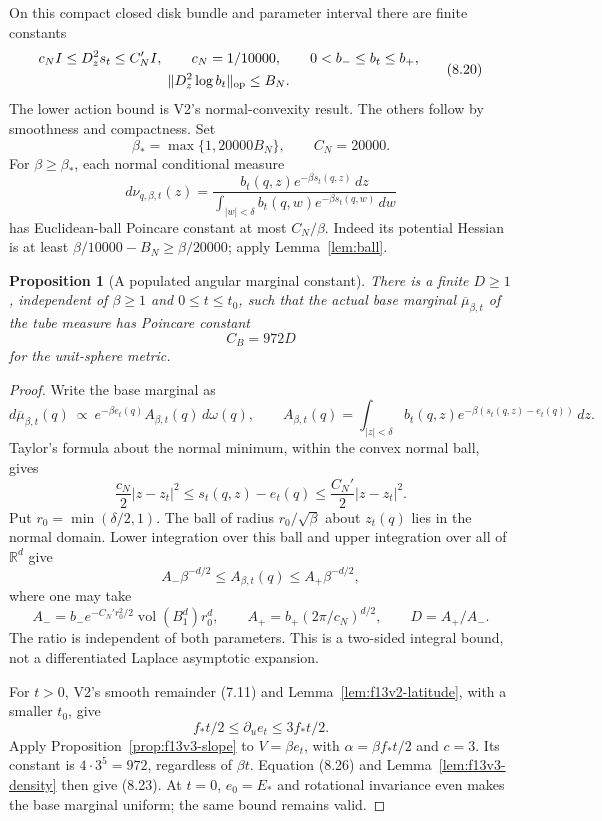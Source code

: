 \documentclass[11pt,oneside]{article}
\newtheorem{proposition}[theorem]{Proposition}
\begin{document}
On this compact closed disk
bundle and parameter interval
there are finite constants
\[
 \begin{gathered}
 c_N I\le D_z^2s_t\le C_N'I,
       \qquad c_N=1/10000,\qquad
       0<b_-\le b_t\le b_+,\\
 \|D_z^2\log b_t\|_{\rm op}\le B_N .
 \end{gathered}
 \tag{8.20}
\]
The lower action bound is
V2's normal-convexity result.
The others follow by
smoothness and compactness.
Set
\[
       \beta_*=\max\{1,20000 B_N\},\qquad C_N=20000.
 \tag{8.21}
\]
For \(\beta\ge\beta_*\), each
normal conditional measure
\[
 d\nu_{q,\beta,t}(z)
   =\frac{b_t(q,z)e^{-\beta s_t(q,z)}\,dz}
          {\int_{|w|<\delta}b_t(q,w)e^{-\beta s_t(q,w)}\,dw}
 \tag{8.22}
\]
has Euclidean-ball Poincare
constant at most \(C_N/\beta\).
Indeed its potential Hessian
is at least
\(\beta/10000-B_N\ge\beta/20000\);
apply Lemma~\ref{lem:ball}.

\begin{proposition}[A populated angular marginal constant]
\label{prop:f13v3-marginal}
There is a finite \(D\ge1\),
independent of \(\beta\ge1\)
and \(0\le t\le t_0\), such
that the actual base marginal
\(\overline\mu_{\beta,t}\) of
the tube measure has Poincare
constant
\[
                           C_B=972D
 \tag{8.23}
\]
for the unit-sphere metric.
\end{proposition}
\begin{proof}
Write the base marginal as
\[
 d\overline\mu_{\beta,t}(q)
  \ \propto\ e^{-\beta e_t(q)}
          A_{\beta,t}(q)\,d\omega(q),\qquad
 A_{\beta,t}(q)=
 \int_{|z|<\delta}b_t(q,z)
                  e^{-\beta(s_t(q,z)-e_t(q))}\,dz.
 \tag{8.24}
\]
Taylor's formula about the
normal minimum, within the
convex normal ball, gives
\[
 \frac{c_N}{2}|z-z_t|^2
       \le s_t(q,z)-e_t(q)
       \le\frac{C_N'}2|z-z_t|^2.
 \tag{8.25}
\]
Put \(r_0=\min(\delta/2,1)\).
The ball of radius
\(r_0/\sqrt\beta\) about
\(z_t(q)\) lies in the
normal domain. Lower integration
over this ball and upper
integration over all of
\(\mathbb R^d\) give
\[
       A_-\beta^{-d/2}
          \le A_{\beta,t}(q)
          \le A_+\beta^{-d/2},
 \tag{8.26}
\]
where one may take
\[
 A_-=b_-e^{-C_N'r_0^2/2}
                  \operatorname{vol}(B_1^d)r_0^d,
 \qquad
 A_+=b_+(2\pi/c_N)^{d/2},
 \qquad D=A_+/A_-.
 \tag{8.27}
\]
The ratio is independent
of both parameters. This
is a two-sided integral
bound, not a differentiated
Laplace asymptotic expansion.

For \(t>0\), V2's smooth
remainder (7.11) and
Lemma~\ref{lem:f13v2-latitude},
with a smaller \(t_0\), give
\[
              f_*t/2\le\partial_u e_t
                                  \le3f_*t/2.
 \tag{8.28}
\]
Apply Proposition~\ref{prop:f13v3-slope}
to \(V=\beta e_t\), with
\(\alpha=\beta f_*t/2\)
and \(c=3\). Its constant
is \(4\cdot3^5=972\),
regardless of \(\beta t\).
Equation (8.26) and
Lemma~\ref{lem:f13v3-density}
then give (8.23).
At \(t=0\), \(e_0=E_*\)
and rotational invariance
even makes the base marginal
uniform; the same bound
remains valid.
\end{proof}
\end{document}
